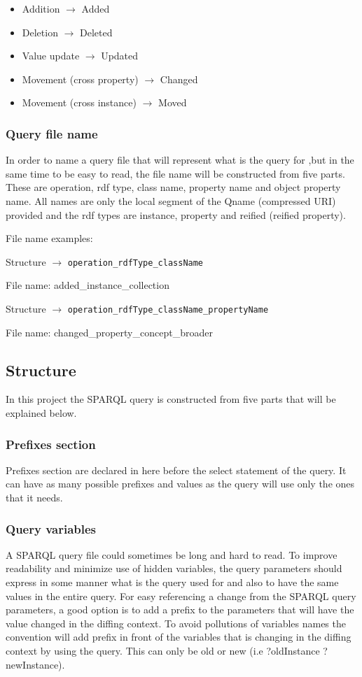 \begin{itemize}
  \item Addition $\rightarrow$ Added
  \item Deletion $\rightarrow$ Deleted
  \item Value update $\rightarrow$ Updated
  \item Movement (cross property) $\rightarrow$ Changed
  \item Movement (cross instance) $\rightarrow$ Moved
\end{itemize}

\subsubsection{Query file name}

In order to name a query file that will represent what is the query for ,but in the same time to be easy to read, the file name will be constructed from five parts. These are operation, rdf type, class name, property name and object property name. All names are only the local segment of the Qname (compressed URI) provided and the rdf types are instance, property and reified (reified property).

File name examples:

Structure $\rightarrow$ \texttt{operation\_rdfType\_className}

File name: added\_instance\_collection

Structure $\rightarrow$ \texttt{operation\_rdfType\_className\_propertyName}

File name: changed\_property\_concept\_broader

\subsection{Structure}
In this project the SPARQL query is constructed from five parts that will be explained below.

\subsubsection{Prefixes section}
Prefixes section are declared in here before the select statement of the query. It can have as many possible prefixes and values as the query will use only the ones that it needs.

\subsubsection{Query variables}
A SPARQL query file could sometimes be long and hard to read. To improve readability and minimize use of hidden variables, the query parameters should express in some manner what is the query used for and also to have the same values in the entire query. For easy referencing a change from the SPARQL query parameters, a good option is to add a prefix to the parameters that will have the value changed in the diffing context. To avoid pollutions of variables names the convention will add prefix in front of the variables that is changing in the diffing context by using the query. This can only be old or new (i.e ?oldInstance ?newInstance).

